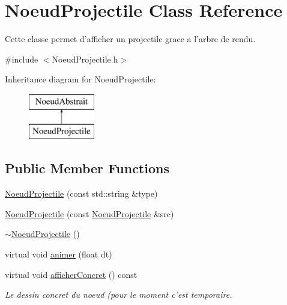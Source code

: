 \hypertarget{class_noeud_projectile}{\section{Noeud\-Projectile Class Reference}
\label{class_noeud_projectile}
}


Cette classe permet d'afficher un projectile grace a l'arbre de rendu.  




{\ttfamily \#include $<$Noeud\-Projectile.\-h$>$}

Inheritance diagram for Noeud\-Projectile\-:\begin{figure}[H]
\begin{center}
\leavevmode
\includegraphics[height=2.000000cm]{class_noeud_projectile}
\end{center}
\end{figure}
\subsection*{Public Member Functions}
\begin{DoxyCompactItemize}
\item 
\hyperlink{class_noeud_projectile_acc40e58645d941f6a8169e009f3bffda}{Noeud\-Projectile} (const std\-::string \&type)
\item 
\hyperlink{class_noeud_projectile_a41b1f5a62f11d001af734c6afa7131ba}{Noeud\-Projectile} (const \hyperlink{class_noeud_projectile}{Noeud\-Projectile} \&src)
\item 
\hyperlink{class_noeud_projectile_a48ec93ba735e4d4e05c365bcaf901d15}{$\sim$\-Noeud\-Projectile} ()
\item 
virtual void \hyperlink{class_noeud_projectile_afaca531eaf522998d34eba290a8ffb74}{animer} (float dt)
\item 
\hypertarget{class_noeud_projectile_a531942f329113293d45b036aee60fafc}{virtual void \hyperlink{class_noeud_projectile_a531942f329113293d45b036aee60fafc}{afficher\-Concret} () const }\label{class_noeud_projectile_a531942f329113293d45b036aee60fafc}

\begin{DoxyCompactList}\small\item\em Le dessin concret du noeud (pour le moment c'est temporaire. \end{DoxyCompactList}\end{DoxyCompactItemize}
